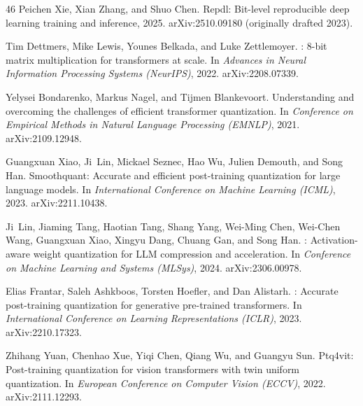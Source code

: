 \documentclass[11pt]{article}
\begin{document}
\begin{thebibliography}{46}
Peichen Xie, Xian Zhang, and Shuo Chen.
\newblock Repdl: Bit-level reproducible deep learning training and inference, 2025.
\newblock arXiv:2510.09180 (originally drafted 2023).

Tim Dettmers, Mike Lewis, Younes Belkada, and Luke Zettlemoyer.
: 8-bit matrix multiplication for transformers at scale.
\newblock In \emph{Advances in Neural Information Processing Systems (NeurIPS)}, 2022.
\newblock arXiv:2208.07339.

Yelysei Bondarenko, Markus Nagel, and Tijmen Blankevoort.
\newblock Understanding and overcoming the challenges of efficient transformer quantization.
\newblock In \emph{Conference on Empirical Methods in Natural Language Processing (EMNLP)}, 2021.
\newblock arXiv:2109.12948.

Guangxuan Xiao, Ji~Lin, Mickael Seznec, Hao Wu, Julien Demouth, and Song Han.
\newblock Smoothquant: Accurate and efficient post-training quantization for large language models.
\newblock In \emph{International Conference on Machine Learning (ICML)}, 2023.
\newblock arXiv:2211.10438.

Ji~Lin, Jiaming Tang, Haotian Tang, Shang Yang, Wei-Ming Chen, Wei-Chen Wang, Guangxuan Xiao, Xingyu Dang, Chuang Gan, and Song Han.
: Activation-aware weight quantization for {LLM} compression and acceleration.
\newblock In \emph{Conference on Machine Learning and Systems (MLSys)}, 2024.
\newblock arXiv:2306.00978.

Elias Frantar, Saleh Ashkboos, Torsten Hoefler, and Dan Alistarh.
: Accurate post-training quantization for generative pre-trained transformers.
\newblock In \emph{International Conference on Learning Representations (ICLR)}, 2023.
\newblock arXiv:2210.17323.

Zhihang Yuan, Chenhao Xue, Yiqi Chen, Qiang Wu, and Guangyu Sun.
\newblock Ptq4vit: Post-training quantization for vision transformers with twin uniform quantization.
\newblock In \emph{European Conference on Computer Vision (ECCV)}, 2022.
\newblock arXiv:2111.12293.


\end{thebibliography}
\end{document}
